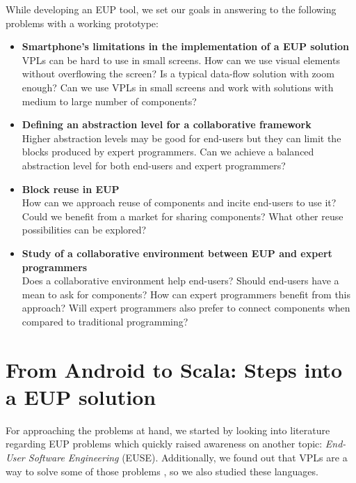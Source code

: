 \documentclass[9pt,a4paper]{extarticle}
\begin{document}
\begin{multicols}{2}
While developing an EUP tool, we set our goals in answering to the following problems with a working prototype:

\begin{itemize}
	\item{\textbf{Smartphone's limitations in the implementation of a EUP solution} \\
    VPLs can be hard to use in small screens. How can we use visual elements without overflowing the screen? Is a typical data-flow solution with zoom enough? Can we use VPLs in small screens and work with solutions with medium to large number of components?}
	
	\item{\textbf{Defining an abstraction level for a collaborative framework} \\
	Higher abstraction levels may be good for end-users but they can limit the blocks produced by expert programmers. Can we achieve a balanced abstraction level for both end-users and expert programmers?}
  
	\item{\textbf{Block reuse in EUP} \\
    How can we approach reuse of components and incite end-users to use it?
    Could we benefit from a market for sharing components? What other reuse possibilities can be explored?}
	
	\item{\textbf{Study of a collaborative environment between EUP and expert programmers} \\
    Does a collaborative environment help end-users? Should end-users have a mean to ask for components? How can expert programmers benefit from this approach? Will expert programmers also prefer to connect components when compared to traditional programming?}
\end{itemize}

\section{From Android to Scala: Steps into a EUP solution}\label{sec:work}

For approaching the problems at hand, we started by looking into literature regarding EUP problems \cite{Barriers2004} which quickly raised awareness on another topic: \emph{End-User Software Engineering} (EUSE).
Additionally, we found out that VPLs are a way to solve some of those problems \cite{Navarro2001}, so we also studied these languages.


\end{multicols}
\end{document}
